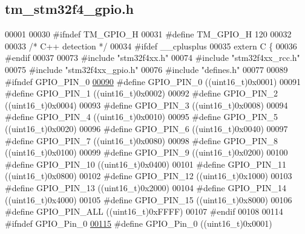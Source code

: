 \hypertarget{tm__stm32f4__gpio_8h_source}{}\subsection{tm\+\_\+stm32f4\+\_\+gpio.\+h}

\begin{DoxyCode}
00001 
00030 \textcolor{preprocessor}{#ifndef TM\_GPIO\_H}
00031 \textcolor{preprocessor}{#define TM\_GPIO\_H 120}
00032 
00033 \textcolor{comment}{/* C++ detection */}
00034 \textcolor{preprocessor}{#ifdef \_\_cplusplus}
00035 \textcolor{keyword}{extern} C \{
00036 \textcolor{preprocessor}{#endif}
00037 
00073 \textcolor{preprocessor}{#include "stm32f4xx.h"}
00074 \textcolor{preprocessor}{#include "stm32f4xx\_rcc.h"}
00075 \textcolor{preprocessor}{#include "stm32f4xx\_gpio.h"}
00076 \textcolor{preprocessor}{#include "defines.h"}
00077 
00089 \textcolor{preprocessor}{#ifndef GPIO\_PIN\_0}
\hypertarget{tm__stm32f4__gpio_8h_source_l00090}{}\hyperlink{group___t_m___g_p_i_o___macros_ga176efbf43a259b7bb0a85a47401505be}{00090} \textcolor{preprocessor}{#define GPIO\_PIN\_0      ((uint16\_t)0x0001)}
00091 \textcolor{preprocessor}{#define GPIO\_PIN\_1      ((uint16\_t)0x0002)}
00092 \textcolor{preprocessor}{#define GPIO\_PIN\_2      ((uint16\_t)0x0004)}
00093 \textcolor{preprocessor}{#define GPIO\_PIN\_3      ((uint16\_t)0x0008)}
00094 \textcolor{preprocessor}{#define GPIO\_PIN\_4      ((uint16\_t)0x0010)}
00095 \textcolor{preprocessor}{#define GPIO\_PIN\_5      ((uint16\_t)0x0020)}
00096 \textcolor{preprocessor}{#define GPIO\_PIN\_6      ((uint16\_t)0x0040)}
00097 \textcolor{preprocessor}{#define GPIO\_PIN\_7      ((uint16\_t)0x0080)}
00098 \textcolor{preprocessor}{#define GPIO\_PIN\_8      ((uint16\_t)0x0100)}
00099 \textcolor{preprocessor}{#define GPIO\_PIN\_9      ((uint16\_t)0x0200)}
00100 \textcolor{preprocessor}{#define GPIO\_PIN\_10     ((uint16\_t)0x0400)}
00101 \textcolor{preprocessor}{#define GPIO\_PIN\_11     ((uint16\_t)0x0800)}
00102 \textcolor{preprocessor}{#define GPIO\_PIN\_12     ((uint16\_t)0x1000)}
00103 \textcolor{preprocessor}{#define GPIO\_PIN\_13     ((uint16\_t)0x2000)}
00104 \textcolor{preprocessor}{#define GPIO\_PIN\_14     ((uint16\_t)0x4000)}
00105 \textcolor{preprocessor}{#define GPIO\_PIN\_15     ((uint16\_t)0x8000)}
00106 \textcolor{preprocessor}{#define GPIO\_PIN\_ALL    ((uint16\_t)0xFFFF)}
00107 \textcolor{preprocessor}{#endif}
00108 
00114 \textcolor{preprocessor}{#ifndef GPIO\_Pin\_0}
\hypertarget{tm__stm32f4__gpio_8h_source_l00115}{}\hyperlink{group___t_m___g_p_i_o___macros_gab305b8d1be9f89bf2b4a05589b456049}{00115} \textcolor{preprocessor}{#define GPIO\_Pin\_0      ((uint16\_t)0x0001)}

\end{DoxyCode}

